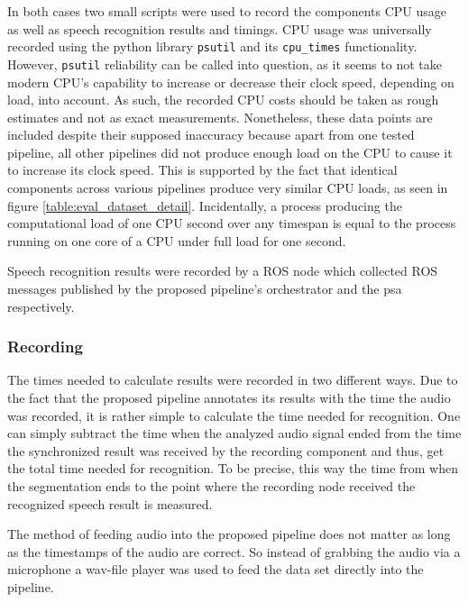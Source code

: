 In both cases two small scripts were used to record the components CPU usage as well as speech recognition results and timings.
CPU usage was universally recorded using the python library \texttt{psutil} \cite{psutil} and its \texttt{cpu\_times} functionality.
However, \texttt{psutil} reliability can be called into question, as it seems to not take modern CPU's capability to increase or decrease their clock speed, depending on load, into account.
As such, the recorded CPU costs should be taken as rough estimates and not as exact measurements.
Nonetheless, these data points are included despite their supposed inaccuracy because apart from one tested pipeline, all other pipelines did not produce enough load on the CPU to cause it to increase its clock speed.
This is supported by the fact that identical components across various pipelines produce very similar CPU loads, as seen in figure 
\ref{table:eval_dataset_detail}.
Incidentally, a process producing the computational load of one CPU second over any timespan is equal to the process running on one core of a CPU under full load for one second.

Speech recognition results were recorded by a ROS node which collected ROS messages published by the proposed pipeline's orchestrator and the \gls{psa} respectively.

\subsubsection{Recording}

The times needed to calculate results were recorded in two different ways.
Due to the fact that the proposed pipeline annotates its results with the time the audio was recorded, it is rather simple to calculate the time needed for recognition.
One can simply subtract the time when the analyzed audio signal ended from the time the synchronized result was received by the recording component and thus, get the total time needed for recognition.
To be precise, this way the time from when the segmentation ends to the point where the recording node received the recognized speech result is measured.

The method of feeding audio into the proposed pipeline does not matter as long as the timestamps of the audio are correct.
So instead of grabbing the audio via a microphone a wav-file player was used to feed the data set directly into the pipeline.

